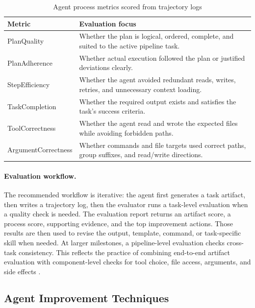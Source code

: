 \begin{table}[htbp]
\centering
\small
\begin{tabularx}{\textwidth}{p{}X}
\toprule
\textbf{Metric} & \textbf{Evaluation focus} \\
\midrule
PlanQuality & Whether the plan is logical, ordered, complete, and suited to the active pipeline task. \\
PlanAdherence & Whether actual execution followed the plan or justified deviations clearly. \\
StepEfficiency & Whether the agent avoided redundant reads, writes, retries, and unnecessary context loading. \\
TaskCompletion & Whether the required output exists and satisfies the task's success criteria. \\
ToolCorrectness & Whether the agent read and wrote the expected files while avoiding forbidden paths. \\
ArgumentCorrectness & Whether commands and file targets used correct paths, group suffixes, and read/write directions. \\
\bottomrule
\end{tabularx}
\caption{Agent process metrics scored from trajectory logs}
\label{tab:process-rubric}
\end{table}

\paragraph{Evaluation workflow.}
The recommended workflow is iterative: the agent first generates a task artifact, then writes a trajectory log, then the evaluator runs a task-level evaluation when a quality check is needed. The evaluation report returns an artifact score, a process score, supporting evidence, and the top improvement actions. Those results are then used to revise the output, template, command, or task-specific skill when needed. At larger milestones, a pipeline-level evaluation checks cross-task consistency. This reflects the practice of combining end-to-end artifact evaluation with component-level checks for tool choice, file access, arguments, and side effects \cite{braintrust-agent-eval,openlayer-agent-eval,dailydose-agent-metrics}.



\subsection{Agent Improvement Techniques}
